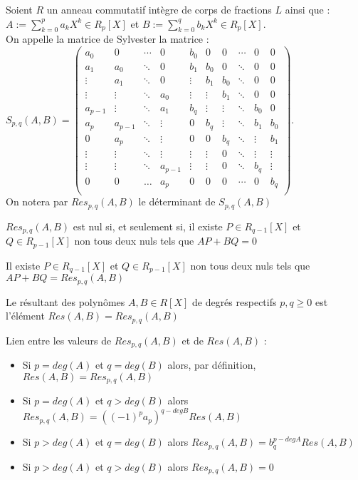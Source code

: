Soient $R$ un anneau commutatif int\`egre de corps de fractions $L$ ainsi que : \\
$A:=\sum_{k=0}^p a_kX^k \in R_p[X]$ et $B:=\sum_{k=0}^q b_kX^k \in R_p[X]$.\\
On appelle la matrice de Sylvester la matrice : \\
$S_{p,q}(A,B)=\begin{pmatrix}
a_0 & 0 &\cdots & 0 & b_0 & 0 &0 & \cdots & 0 & 0 \\
a_1 & a_0& \ddots & 0 &b_1 & b_0 &0 & \ddots & 0 & 0 \\
\vdots & a_1 &\ddots & 0 &\vdots & b_1 &b_0 & \ddots & 0 & 0 \\
\vdots & \vdots &\ddots & a_0 &\vdots & \vdots & b_1 & \ddots & 0 & 0 \\
a_ {p-1} & \vdots& \ddots & a_1 &b_q & \vdots &\vdots & \ddots & b_0 & 0 \\
a_p & a_{p-1} &\ddots & \vdots &0 & b_q &\vdots & \ddots & b_1 & b_0 \\
0 & a_p &\ddots & \vdots &0 & 0 &b_q & \ddots & \vdots & b_1 \\
\vdots & \vdots &\ddots & \vdots &\vdots & \vdots &0 & \ddots & \vdots & \vdots \\
\vdots & \vdots &\ddots & a_{p-1} &\vdots & \vdots &0 & \ddots & b_q & \vdots \\
0 & 0& \ldots & a_p &0 & 0 &0 & \cdots & 0 & b_q \\
\end{pmatrix}$. \\
On notera par $Res_{p,q}(A,B)$ le d\'eterminant de $S_{p,q}(A,B)$
\begin{prop}
$Res_{p,q}(A,B)$ est nul si, et seulement si, il existe $P \in R_{q-1}[X]$ et $Q \in R_{p-1}[X]$ non tous deux nuls tels que $AP+BQ=0$
\end{prop}
\begin{prop}
Il existe $P \in R_{q-1}[X]$ et $Q \in R_{p-1}[X]$ non tous deux nuls tels que $AP+BQ=Res_{p,q}(A,B)$
\end{prop}
\begin{Def}
Le r\'esultant des polyn\^omes $A,B \in R[X]$ de degr\'es respectifs $p,q \geq 0$ est l'\'el\'ement $Res(A,B)=Res_{p,q}(A,B)$
\end{Def}
\begin{Rq}
Lien entre les valeurs de $Res_{p,q}(A,B)$ et de $Res(A,B)$ : 
\begin{itemize}
    \item Si $p=deg(A)$ et $q=deg(B)$ alors, par d\'efinition, $Res(A,B)=Res_{p,q}(A,B)$
    \item Si $p=deg(A)$ et $q>deg(B)$ alors $Res_{p,q}(A,B)=((-1)^p a_p)^{q-deg B}Res(A,B)$
    \item Si $p>deg(A)$ et $q=deg(B)$ alors $Res_{p,q}(A,B)=b_q^{p-deg A}Res(A,B)$
    \item Si $p>deg(A)$ et $q>deg(B)$ alors $Res_{p,q}(A,B)=0$
\end{itemize}
\end{Rq}
